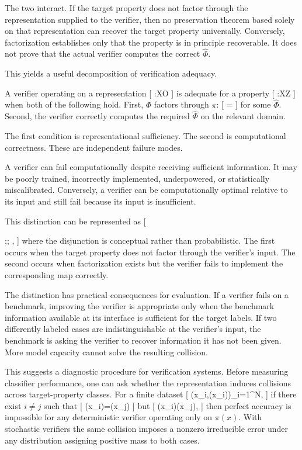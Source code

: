 \documentclass[11pt]{article}
\begin{document}
The two interact. If the target property does not factor through the representation supplied to the verifier, then no preservation theorem based solely on that representation can recover the target property universally. Conversely, factorization establishes only that the property is in principle recoverable. It does not prove that the actual verifier computes the correct $\widehat{\Phi}$.

This yields a useful decomposition of verification adequacy.

\begin{definition}
A verifier operating on a representation
[
\pi:X\rightarrow O
]
is adequate for a property
[
\Phi:X\rightarrow Z
]
when both of the following hold. First, $\Phi$ factors through $\pi$:
[
\Phi=\widehat{\Phi}\circ\pi
]
for some $\widehat{\Phi}$. Second, the verifier correctly computes the required $\widehat{\Phi}$ on the relevant domain.
\end{definition}

The first condition is representational sufficiency. The second is computational correctness. These are independent failure modes.

A verifier can fail computationally despite receiving sufficient information. It may be poorly trained, incorrectly implemented, underpowered, or statistically miscalibrated. Conversely, a verifier can be computationally optimal relative to its input and still fail because its input is insufficient.

This distinction can be represented as
[

;\lor;
,
]
where the disjunction is conceptual rather than probabilistic. The first occurs when the target property does not factor through the verifier's input. The second occurs when factorization exists but the verifier fails to implement the corresponding map correctly.

The distinction has practical consequences for evaluation. If a verifier fails on a benchmark, improving the verifier is appropriate only when the benchmark information available at its interface is sufficient for the target labels. If two differently labeled cases are indistinguishable at the verifier's input, the benchmark is asking the verifier to recover information it has not been given. More model capacity cannot solve the resulting collision.

This suggests a diagnostic procedure for verification systems. Before measuring classifier performance, one can ask whether the representation induces collisions across target-property classes. For a finite dataset
[
{(x_i,\Phi(x_i))}_{i=1}^N,
]
if there exist $i\neq j$ such that
[
\pi(x_i)=\pi(x_j)
]
but
[
\Phi(x_i)\neq\Phi(x_j),
]
then perfect accuracy is impossible for any deterministic verifier operating only on $\pi(x)$. With stochastic verifiers the same collision imposes a nonzero irreducible error under any distribution assigning positive mass to both cases.
\end{document}
